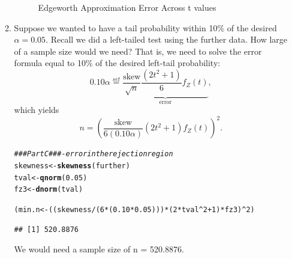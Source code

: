 \documentclass{article}\usepackage[]{graphicx}\usepackage[]{xcolor}
\makeatletter
\newcommand{\hlnum}[1]{\textcolor[rgb]{0.686,0.059,0.569}{#1}}%
\newcommand{\hlcom}[1]{\textcolor[rgb]{0.678,0.584,0.686}{\textit{#1}}}%
\newcommand{\hlopt}[1]{\textcolor[rgb]{0,0,0}{#1}}%
\newcommand{\hldef}[1]{\textcolor[rgb]{0.345,0.345,0.345}{#1}}%
\newcommand{\hlkwb}[1]{\textcolor[rgb]{0.69,0.353,0.396}{#1}}%
\newcommand{\hlkwd}[1]{\textcolor[rgb]{0.737,0.353,0.396}{\textbf{#1}}}%
\newenvironment{kframe}{%
 \def\at@end@of@kframe{}%
 \ifinner\ifhmode%
  \def\at@end@of@kframe{\end{minipage}}%
  \begin{minipage}{\columnwidth}%
 \fi\fi%
 \def\FrameCommand##1{\hskip\@totalleftmargin \hskip-\fboxsep
 \colorbox{shadecolor}{##1}\hskip-\fboxsep
     \hskip-\linewidth \hskip-\@totalleftmargin \hskip\columnwidth}%
 \MakeFramed {\advance\hsize-\width
   \@totalleftmargin\z@ \linewidth\hsize
   \@setminipage}}%
 {\par\unskip\endMakeFramed%
 \at@end@of@kframe}
\newenvironment{knitrout}{}{} %
\makeatother
\begin{document}
\begin{enumerate}
\begin{enumerate}
\begin{figure}[H]
\begin{center}
\begin{knitrout}
{}


\end{knitrout}
\caption{Edgeworth Approximation Error Across t values}
\label{plot1} 
\end{center}
\end{figure}
  \item Suppose we wanted to have a tail probability within 10\% of the desired
  $\alpha=0.05$. Recall we did a left-tailed test using the further data.
  How large of a sample size would we need? That is, we need
  to solve the error formula equal to 10\% of the desired left-tail probability:
  \[0.10 \alpha  \stackrel{set}{=} \underbrace{\frac{\text{skew}}{\sqrt{n}} \frac{(2t^2+1)}{6} f_Z(t)}_{\textrm{error}},\]
  which yields
  \[ n = \left(\frac{\text{skew}}{6(0.10\alpha)} (2t^2 + 1) f_Z(t)\right)^2.\]
\begin{knitrout}
\color{fgcolor}\begin{kframe}
\begin{alltt}
\hlcom{### Part C ### - error in the rejection region}
\hldef{skewness} \hlkwb{<-} \hlkwd{skewness}\hldef{(further)}
\hldef{tval} \hlkwb{<-} \hlkwd{qnorm}\hldef{(}\hlnum{0.05}\hldef{)}
\hldef{fz3} \hlkwb{<-} \hlkwd{dnorm}\hldef{(tval)}

\hldef{(min.n} \hlkwb{<-} \hldef{((skewness}\hlopt{/}\hldef{(}\hlnum{6}\hlopt{*}\hldef{(}\hlnum{0.10}\hlopt{*}\hlnum{0.05}\hldef{)))} \hlopt{*} \hldef{(}\hlnum{2}\hlopt{*}\hldef{tval}\hlopt{^}\hlnum{2} \hlopt{+} \hlnum{1}\hldef{)} \hlopt{*}\hldef{fz3)}\hlopt{^}\hlnum{2}\hldef{)}
\end{alltt}
\begin{verbatim}
## [1] 520.8876
\end{verbatim}
\end{kframe}
\end{knitrout}
We would need a sample size of n = 520.8876. 
  

\end{enumerate}
\end{enumerate}
\end{document}
